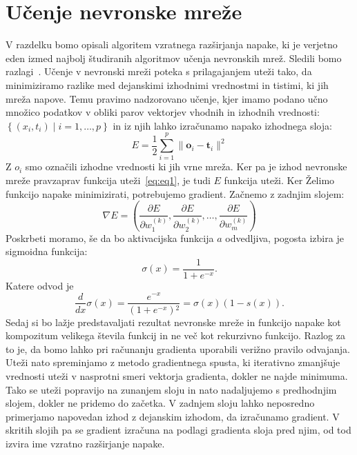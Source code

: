 \section{Učenje nevronske mreže}
V razdelku bomo opisali algoritem vzratnega razširjanja napake, ki je verjetno eden izmed najbolj študiranih algoritmov učenja nevronskih mrež. Sledili bomo razlagi~\cite{rojas1996backpropagation}.
Učenje v nevronski mreži poteka s prilagajanjem uteži tako, da minimiziramo razlike med dejanskimi izhodnimi vrednostmi in tistimi, ki jih mreža napove. Temu pravimo nadzorovano učenje, kjer imamo podano učno množico podatkov v obliki parov vektorjev vhodnih in izhodnih vrednosti: $\left\{ (x_i, t_i) \mid i = 1, \ldots, p \right\}$ in iz njih lahko izračunamo napako izhodnega sloja:
\begin{equation}
  E = \frac{1}{2} \sum_{i=1}^{p} \|\mathbf{o}_i - \mathbf{t}_i\|^2
\end{equation}
Z $o_{i}$ smo označili izhodne vrednosti ki jih vrne mreža. Ker pa je izhod nevronske mreže pravzaprav funkcija uteži~\ref{eq:eq1}, je tudi $E$ funkcija uteži. Ker Želimo funkcijo napake minimizirati, potrebujemo gradient. Začnemo z zadnjim slojem:
\begin{equation}
  \nabla E = \left( \frac{\partial E}{\partial w^{(k)}_1}, \frac{\partial E}{\partial w^{(k)}_2}, \ldots, \frac{\partial E}{\partial w^{(k)}_m} \right)
\end{equation}
Poskrbeti moramo, še da bo aktivacijska funkcija $a$ odvedljiva, pogosta izbira je sigmoidna funkcija:
\begin{equation}
  \sigma(x) = \frac{1}{1 + e^{-x}}.
\end{equation}
Katere odvod je
\begin{equation}
  \frac{d}{dx}\sigma(x) = \frac{e^{-x}}{\left(1+e^{-x}\right){}^2} = \sigma(x)\left(1 - s(x)\right).
\end{equation}
Sedaj si bo lažje predstavaljati rezultat nevronske mreže in funkcijo napake kot kompozitum velikega števila funkcij in ne več kot rekurzivno funkcijo. Razlog za to je, da bomo lahko pri računanju gradienta uporabili verižno pravilo odvajanja. Uteži nato spreminjamo z metodo gradientnega spusta, ki iterativno zmanjšuje vrednosti uteži v nasprotni smeri vektorja gradienta, dokler ne najde minimuma. Tako se uteži popravijo na zunanjem sloju in nato nadaljujemo s predhodnjim slojem, dokler ne pridemo do začetka. V zadnjem sloju lahko neposredno primerjamo napovedan izhod z dejanskim izhodom, da izračunamo gradient. V skritih slojih pa se gradient izračuna na podlagi gradienta sloja pred njim, od tod izvira ime vzratno razširjanje napake.

